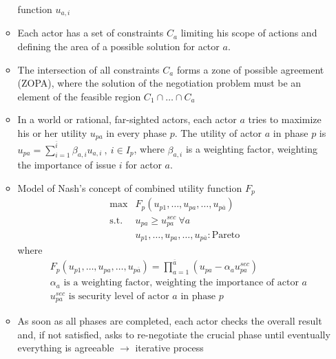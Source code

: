 \begin{itemize}
\begin{itemize}
                function $u_{a,i}$
            \item Each actor has a set of constraints $C_a$ limiting his scope
                of actions and defining the area of a possible solution for
                actor $a$.
            \item The intersection of all constraints $C_a$ forms a zone of
                possible agreement (ZOPA), where the solution of the
                negotiation problem must be an element of the feasible region
                $C_1 \cap \dots \cap C_a$
            \item In a world or rational, far-sighted actors, each actor $a$ tries
                to maximize his or her utility $u_{p a}$ in every phase $p$.
                The utility of actor $a$ in phase $p$ is $u_{p a} =
                \sum_{i=1}^{\overline{i}} \beta_{a,i} u_{a,i} \ , \ i \in I_p$,
                where $\beta_{a,i}$ is a weighting factor, weighting the
                importance of issue $i$ for actor $a$.
            \item Model of Nash's concept of combined utility function $F_p$
                \begin{align*}
                    \max &F_p (u_{p1},\dots,u_{pa},\dots,u_{p \overline{a}})
                    \\
                    \text{s.t. } &u_{pa} \geq u_{pa}^{sec} \ \forall a
                    \\
                    &u_{p1},\dots,u_{pa},\dots,u_{p \overline{a}} : \text{Pareto}
                \end{align*}
                where
                \begin{align*}
                    &F_p (u_{p1},\dots,u_{pa},\dots,u_{p \overline{a}}) = \prod_{a=1}^{\overline{a}} (u_{pa} - \alpha_a u_{pa}^{sec})
                    \\
                    &\alpha_a \text{ is a weighting factor, weighting the importance of actor } a
                    \\
                    &u_{pa}^{sec} \text{ is security level of actor $a$ in phase } p
                \end{align*}
            \item As soon as all phases are completed, each actor checks the overall
                result and, if not satisfied, asks to re-negotiate the crucial phase
                until eventually everything is agreeable $\rightarrow$ iterative
                process
        \end{itemize}

\end{itemize}
